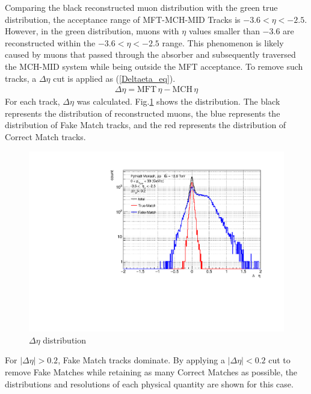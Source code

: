             Comparing the black reconstructed muon distribution with the green true distribution, the acceptance range of MFT-MCH-MID Tracks is \(-3.6 < \eta < -2.5\). However, in the green distribution, muons with \(\eta\) values smaller than \(-3.6\) are reconstructed within the \(-3.6 < \eta < -2.5\) range. This phenomenon is likely caused by muons that passed through the absorber and subsequently traversed the MCH-MID system while being outside the MFT acceptance. 
            To remove such tracks, a \(\Delta \eta\) cut is applied as (\ref{Deltaeta_eq}).\@
            \begin{eqnarray}
                \label{Deltaeta_eq}
                \Delta \eta = \text{MFT} \, \eta - \text{MCH} \, \eta  
            \end{eqnarray}
            For each track, \(\Delta \eta\) was calculated. Fig.\ref{Analysis:Matching:DeltaEta} shows the distribution. The black represents the distribution of reconstructed muons, the blue represents the distribution of Fake Match tracks, and the red represents the distribution of Correct Match tracks.
            \begin{figure}[H]
                \centering
                \includegraphics[keepaspectratio, scale=0.5]{fig/3_5_6_etacutno_deltaeta.pdf} %
                \caption{$\Delta \eta$ distribution}
                \label{Analysis:Matching:DeltaEta}
            \end{figure}
            For \( |\Delta \eta| > 0.2 \), Fake Match tracks dominate. By applying a \( |\Delta \eta| < 0.2 \) cut to remove Fake Matches while retaining as many Correct Matches as possible, the distributions and resolutions of each physical quantity are shown for this case.
